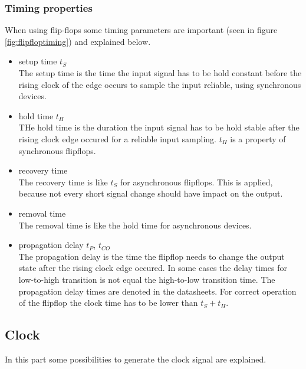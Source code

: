 \subsubsection{Timing properties}
When using flip-flops some timing parameters are important (seen in figure \ref{fig:flipfloptiming}) and explained below.
\begin{itemize}
\item setup time $t_{S}$\\
The setup time is the time the input signal has to be hold constant before the rising clock of the edge occurs to sample the input reliable, using synchronous devices.
\item hold time $t_{H}$\\
THe hold time is the duration the input signal has to be hold stable after the rising clock edge occured for a reliable input sampling. $t_{H}$ is a property of synchronous flipflops.
\item recovery time\\
The recovery time is like $t_{S}$ for asynchronous flipflops. This is applied, because not every short signal change should have impact on the output. 
\item removal time\\
The removal time is like the hold time for asynchronous devices.
\item propagation delay $t_{P}$, $t_{CO}$\\
The propagation delay is the time the flipflop needs to change the output state after the rising clock edge occured. In some cases the delay times for low-to-high transition is not equal the high-to-low transition time. The propagation delay times are denoted in the datasheets. For correct operation of the flipflop the clock time has to be lower than $t_{S}+t_{H}$.
\end{itemize}
\subsection{Clock}
In this part some possibilities to generate the clock signal are explained.
